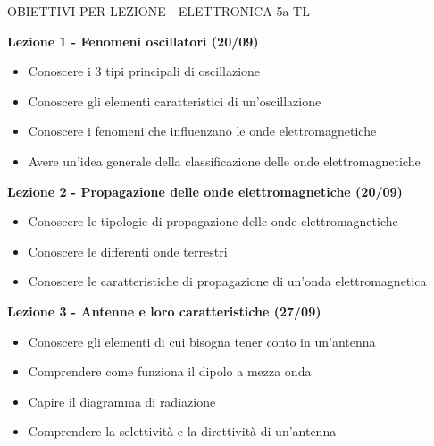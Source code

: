 \documentclass{article}
\begin{document}
	\begin{center}
		\begin{huge}
			OBIETTIVI PER LEZIONE - ELETTRONICA 5a TL
		\end{huge}
	\end{center}

	\begin{center}
	\end{center}
	
	

	\begin{center}
		\textbf{Lezione 1 - Fenomeni oscillatori (20/09)}
		\begin{itemize}
			\item Conoscere i 3 tipi principali di oscillazione
			\item Conoscere gli elementi caratteristici di un'oscillazione
			\item Conoscere i fenomeni che influenzano le onde elettromagnetiche
			\item Avere un'idea generale della classificazione delle onde elettromagnetiche
		\end{itemize}
	\end{center}

	\begin{center}
		\textbf{Lezione 2 - Propagazione delle onde elettromagnetiche (20/09)}
		\begin{itemize}
			\item Conoscere le tipologie di propagazione delle onde elettromagnetiche
			\item Conoscere le differenti onde terrestri
			\item Conoscere le caratteristiche di propagazione di un'onda elettromagnetica
		\end{itemize}
	\end{center}

	\begin{center}
		\textbf{Lezione 3 - Antenne e loro caratteristiche (27/09)}
		\begin{itemize}
			\item Conoscere gli elementi di cui bisogna tener conto in un'antenna
			\item Comprendere come funziona il dipolo a mezza onda
			\item Capire il diagramma di radiazione
			\item Comprendere la selettività e la direttività di un'antenna
		\end{itemize}
	\end{center}
\end{document}
